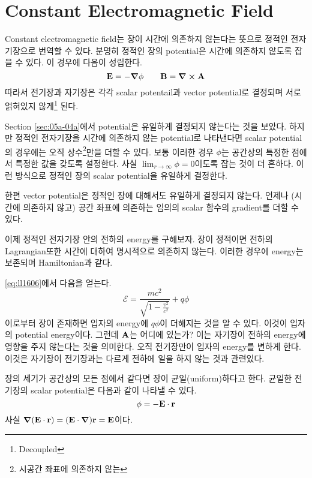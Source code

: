 \section[Constant EM Field]{Constant Electromagnetic Field}
\label{sec:05a-05a}

Constant electromagnetic field는 장이 시간에 의존하지 않는다는 뜻으로 정적인 전자기장으로 번역할 수 있다. 분명히 정적인 장의 potential은 시간에 의존하지 않도록 잡을 수 있다. 이 경우에 다음이 성립한다.
\begin{equation}\label{eq:ll1901}
    \vb{E} = - \grad \phi \qquad \vb{B} = \curl \vb{A}
\end{equation}
따라서 전기장과 자기장은 각각 scalar potentail과 vector potential로 결정되며 서로 얽혀있지 않게\footnote{Decoupled} 된다.

Section \ref{sec:05a-04a}에서 potential은 유일하게 결정되지 않는다는 것을 보았다. 하지만 정적인 전자기장을 시간에 의존하지 않는 potential로 나타낸다면 scalar potential의 경우에는 오직 상수\footnote{시공간 좌표에 의존하지 않는}만을 더할 수 있다. 보통 이러한 경우 $\phi$는 공간상의 특정한 점에서 특정한 값을 갖도록 설정한다. 사실 $\lim _{r \to \infty} \phi = 0$이도록 잡는 것이 더 흔하다. 이런 방식으로 정적인 장의 scalar potential을 유일하게 결정한다.

한편 vector potential은 정적인 장에 대해서도 유일하게 결정되지 않는다. 언제나 (시간에 의존하지 않고) 공간 좌표에 의존하는 임의의 scalar 함수의 gradient를 더할 수 있다.

이제 정적인 전자기장 안의 전하의 energy를 구해보자. 장이 정적이면 전하의 Lagrangian또한 시간에 대하여 명시적으로 의존하지 않는다. 이러한 경우에 energy는 보존되며 Hamiltonian과 같다.

\eqref{eq:ll1606}에서 다음을 얻는다.
\begin{equation}\label{eq:ll1902}
    \mathcal{E} = \frac{m c^2}{\sqrt{1 - \frac{v^2}{c^2}}} + q \phi
\end{equation}
이로부터 장이 존재하면 입자의 energy에 $q \phi$이 더해지는 것을 알 수 있다. 이것이 입자의 potential energy이다. 그런데 $\vb{A}$는 어디에 있는가? 이는 자기장이 전하의 energy에 영향을 주지 않는다는 것을 의미한다. 오직 전기장만이 입자의 energy를 변하게 한다. 이것은 자기장이 전기장과는 다르게 전하에 일을 하지 않는 것과 관련있다.

장의 세기가 공간상의 모든 점에서 같다면 장이 균일(uniform)하다고 한다.
균일한 전기장의 scalar potential은 다음과 같이 나타낼 수 있다.
\begin{equation}\label{eq:ll1903}
    \phi = - \vb{E} \cdot \vb{r}
\end{equation}
사실 $ \grad(\vb{E \cdot \vb{r}}) = ( \vb{E} \cdot \grad ) \vb{r} = \vb{E} $이다.

